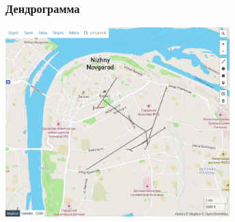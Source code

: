 \documentclass{beamer}
\begin{document}
\begin{frame}
	\frametitle{Дендрограмма}
	\centering
	\includegraphics[width=0.65\textwidth]{dendrogram}
\end{frame}
\end{document}
